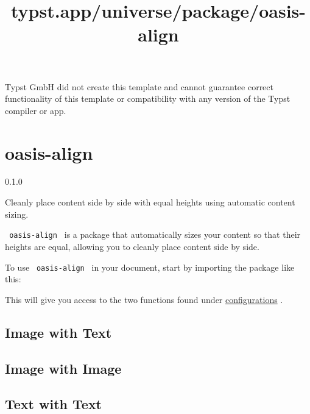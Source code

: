 Typst GmbH did not create this template and cannot guarantee correct
functionality of this template or compatibility with any version of the
Typst compiler or app.


\title{typst.app/universe/package/oasis-align}

\label{banner}
\section{oasis-align}\label{oasis-align}

{ 0.1.0 }

Cleanly place content side by side with equal heights using automatic
content sizing.

\label{readme}
\texttt{\ oasis-align\ } is a package that automatically sizes your
content so that their heights are equal, allowing you to cleanly place
content side by side.

To use \texttt{\ oasis-align\ } in your document, start by importing the
package like this:

\begin{Shaded}
\begin{Highlighting}[]
\end{Highlighting}
\end{Shaded}

This will give you access to the two functions found under
\href{https://github.com/typst/packages/raw/main/packages/preview/oasis-align/0.1.0/\#configuration}{configurations}
.

\subsection{Image with Text}\label{image-with-text}


\subsection{Image with Image}\label{image-with-image}


\subsection{Text with Text}\label{text-with-text}

